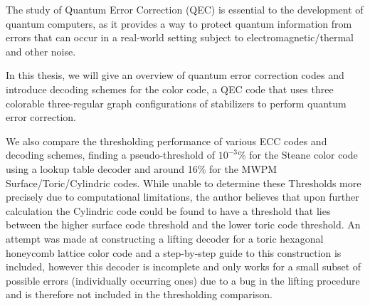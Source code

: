The study of Quantum Error Correction (QEC) is essential to the development
of quantum computers, as it provides a way to protect quantum
information from errors that can occur in 
a real-world setting subject to electromagnetic/thermal and other noise.

In this thesis, we will give an overview of quantum error correction codes 
and introduce decoding schemes for the color code, a QEC code that uses
three colorable three-regular graph configurations of stabilizers
to perform quantum error correction.

We also compare the thresholding performance of various ECC codes and decoding 
schemes, finding a pseudo-threshold of $10^{-3}\%$ for the Steane color code using a 
lookup table decoder and around 16\% for the MWPM Surface/Toric/Cylindric codes.
While unable to determine these Thresholds more precisely due to computational
limitations, the author believes that upon further calculation the Cylindric code
could be found to have a threshold that lies between the higher surface code threshold
and the lower toric code threshold.
An attempt was made at constructing a lifting decoder for a toric hexagonal 
honeycomb lattice color code and a step-by-step guide to this construction is 
included, however this decoder is incomplete and only works for a small subset of 
possible errors (individually occurring ones) due to a bug in 
the lifting procedure and is therefore 
not included in the thresholding comparison.
